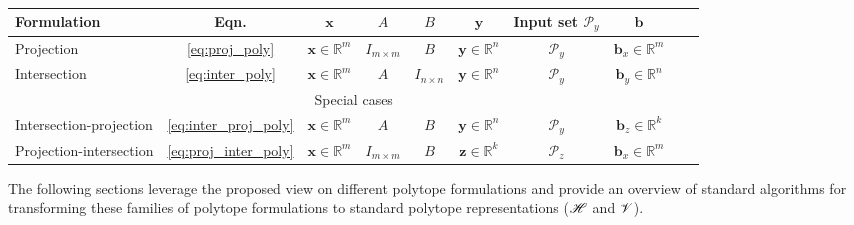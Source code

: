 \begin{table}[!h]
\centering
\begin{tabular}{|l|c|c|c|c|c|c|c|c|c|}
\hline
Formulation & Eqn. & $\bm{x}$ & $A$ & $B$ & $\bm{y}$ & Input set $\mathcal{P}_y$ & $\bm{b}$ \\
\hline
Projection & \ref{eq:proj_poly} & $\bm{x}\in\mathbb{R}^m$ & $I_{m\times m}$& $B$ & $\bm{y}\in\mathbb{R}^n$ & $\mathcal{P}_y$ & $\bm{b}_x\in\mathbb{R}^m$ \\
Intersection & \ref{eq:inter_poly} & $\bm{x}\in\mathbb{R}^m$ & $A$& $I_{n\times n}$ & $\bm{y}\in\mathbb{R}^n$ & $\mathcal{P}_y$ & $\bm{b}_y\in\mathbb{R}^n$ \\
\hline
\multicolumn{10}{c}{Special cases} \\
\hline
Intersection-projection & \ref{eq:inter_proj_poly} & $\bm{x}\in\mathbb{R}^m$ & $A$& $B$ & $\bm{y}\in\mathbb{R}^n$ & $\mathcal{P}_y$ & $\bm{b}_z\in\mathbb{R}^k$ \\
Projection-intersection & \ref{eq:proj_inter_poly} & $\bm{x}\in\mathbb{R}^m$ & $I_{m\times m}$& $B$ & $\bm{z}\in\mathbb{R}^k$ & $\mathcal{P}_z$ & $\bm{b}_x\in\mathbb{R}^m$ \\
\hline
\end{tabular}
\caption{}
\label{tab:generic_formulations}
\end{table}

The following sections leverage the proposed view on different polytope formulations and provide an overview of standard algorithms for transforming these families of polytope formulations to standard polytope representations ($\mathscr{H}$ and $\mathscr{V}$). 

